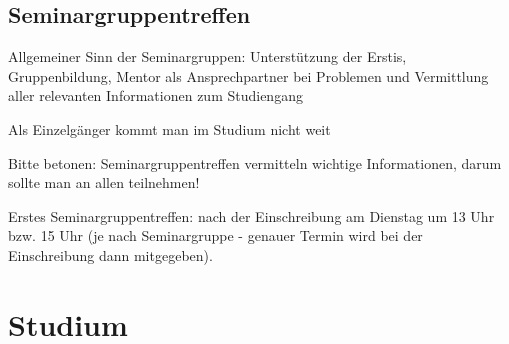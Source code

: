 \documentclass[a4paper,12pt]{report}
\begin{document}
\subsection{Seminargruppentreffen}
\begin{itemize*}
	\item Allgemeiner Sinn der Seminargruppen: Unterstützung der Erstis, Gruppenbildung, Mentor als Ansprechpartner bei Problemen und Vermittlung aller relevanten Informationen zum Studiengang
	\item \glqq Als Einzelgänger kommt man im Studium nicht weit\grqq
	\item Bitte betonen:
	Seminargruppentreffen vermitteln wichtige Informationen, darum sollte man an allen teilnehmen!
	\item Erstes Seminargruppentreffen: nach der Einschreibung am Dienstag um 13 Uhr bzw. 15 Uhr (je nach Seminargruppe - genauer Termin wird bei der Einschreibung dann mitgegeben).
\end{itemize*}

\section{Studium}
\end{document}
